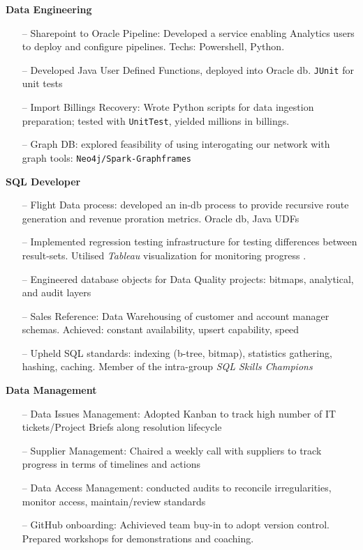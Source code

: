 \documentclass[10pt,a4paper]{altacv}
\begin{document}
\textbf{Data Engineering}
\begin{itemize}
  \setlength{\itemindent}{0.5em}  
  \item[--]   \small{Sharepoint to Oracle Pipeline: Developed a service enabling Analytics users to deploy and configure pipelines. Techs: Powershell, Python. }
    \item[--]   \small{Developed Java User Defined Functions, deployed into Oracle db. \texttt{JUnit} for unit tests} 
    \item[--]   \small{Import Billings Recovery: Wrote Python scripts for data ingestion preparation;  tested with \texttt{UnitTest}, yielded millions in billings.} 
    \item[--]   \small{Graph DB: explored feasibility of using interogating our network with graph tools: \texttt{Neo4j/Spark-Graphframes}} 
\end{itemize}
\textbf{SQL Developer}
\begin{itemize}
  \item[--]   \small{Flight Data process: developed an in-db process to provide recursive route generation and revenue proration metrics. Oracle db, Java UDFs} 
  \item[--]   \small{Implemented regression testing infrastructure for testing differences between result-sets. Utilised \textit{Tableau} visualization for monitoring progress .} 
  \item[--]   \small{Engineered database objects for Data Quality projects: bitmaps, analytical, and audit layers}
  \item[--]   \small{Sales Reference: Data Warehousing of customer and account manager schemas. Achieved: constant availability, upsert capability, speed} 
  \item[--]   \small{Upheld SQL standards: indexing (b-tree, bitmap), statistics gathering, hashing, caching. Member of the intra-group \textit{SQL Skills Champions}} 
\end{itemize}
\textbf{Data Management}
\begin{itemize}
  \item[--]   \small{Data Issues Management: Adopted Kanban to track high number of IT tickets/Project Briefs along resolution lifecycle}
  \item[--]   \small{Supplier Management: Chaired a weekly call with suppliers to track progress in terms of timelines and actions}  
  \item[--]   \small{Data Access Management: conducted audits to reconcile irregularities, monitor access, maintain/review standards}
  \item[--]   \small{GitHub onboarding: Achivieved team buy-in to adopt version control. Prepared workshops for demonstrations and coaching.} 
\end{itemize}
\end{document}
